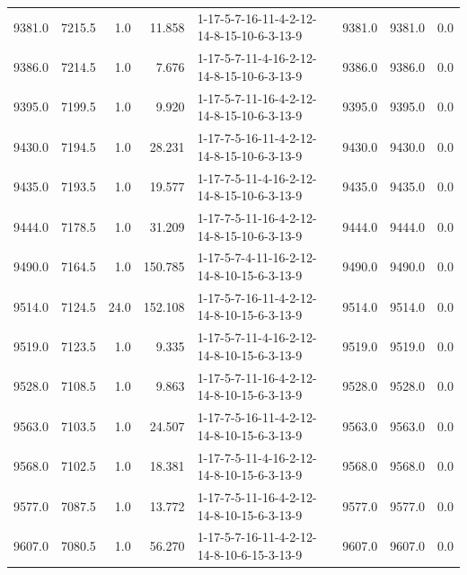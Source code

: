 \begin{tabular}{rrrrlrrr}
  9381.0 &  7215.5 &            1.0 &             11.858 &  1-17-5-7-16-11-4-2-12-14-8-15-10-6-3-13-9 &        9381.0 &          9381.0 &       0.0 \\
  9386.0 &  7214.5 &            1.0 &              7.676 &  1-17-5-7-11-4-16-2-12-14-8-15-10-6-3-13-9 &        9386.0 &          9386.0 &       0.0 \\
  9395.0 &  7199.5 &            1.0 &              9.920 &  1-17-5-7-11-16-4-2-12-14-8-15-10-6-3-13-9 &        9395.0 &          9395.0 &       0.0 \\
  9430.0 &  7194.5 &            1.0 &             28.231 &  1-17-7-5-16-11-4-2-12-14-8-15-10-6-3-13-9 &        9430.0 &          9430.0 &       0.0 \\
  9435.0 &  7193.5 &            1.0 &             19.577 &  1-17-7-5-11-4-16-2-12-14-8-15-10-6-3-13-9 &        9435.0 &          9435.0 &       0.0 \\
  9444.0 &  7178.5 &            1.0 &             31.209 &  1-17-7-5-11-16-4-2-12-14-8-15-10-6-3-13-9 &        9444.0 &          9444.0 &       0.0 \\
  9490.0 &  7164.5 &            1.0 &            150.785 &  1-17-5-7-4-11-16-2-12-14-8-10-15-6-3-13-9 &        9490.0 &          9490.0 &       0.0 \\
  9514.0 &  7124.5 &           24.0 &            152.108 &  1-17-5-7-16-11-4-2-12-14-8-10-15-6-3-13-9 &        9514.0 &          9514.0 &       0.0 \\
  9519.0 &  7123.5 &            1.0 &              9.335 &  1-17-5-7-11-4-16-2-12-14-8-10-15-6-3-13-9 &        9519.0 &          9519.0 &       0.0 \\
  9528.0 &  7108.5 &            1.0 &              9.863 &  1-17-5-7-11-16-4-2-12-14-8-10-15-6-3-13-9 &        9528.0 &          9528.0 &       0.0 \\
  9563.0 &  7103.5 &            1.0 &             24.507 &  1-17-7-5-16-11-4-2-12-14-8-10-15-6-3-13-9 &        9563.0 &          9563.0 &       0.0 \\
  9568.0 &  7102.5 &            1.0 &             18.381 &  1-17-7-5-11-4-16-2-12-14-8-10-15-6-3-13-9 &        9568.0 &          9568.0 &       0.0 \\
  9577.0 &  7087.5 &            1.0 &             13.772 &  1-17-7-5-11-16-4-2-12-14-8-10-15-6-3-13-9 &        9577.0 &          9577.0 &       0.0 \\
  9607.0 &  7080.5 &            1.0 &             56.270 &  1-17-5-7-16-11-4-2-12-14-8-10-6-15-3-13-9 &        9607.0 &          9607.0 &       0.0 \\

\end{tabular}
